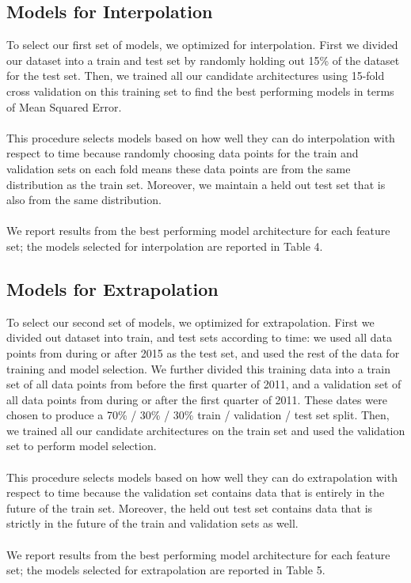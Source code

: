 \documentclass{article}
\begin{document}

\subsection{Models for Interpolation}
To select our first set of models, we optimized for interpolation. First we divided our dataset into a train and test set by randomly holding out 15\% of the dataset for the test set. Then, we trained all our candidate architectures using 15-fold cross validation on this training set to find the best performing models in terms of Mean Squared Error.\\\\
This procedure selects models based on how well they can do interpolation with respect to time because randomly choosing data points for the train and validation sets on each fold means these data points are from the same distribution as the train set. Moreover, we maintain a held out test set that is also from the same distribution.\\\\
We report results from the best performing model architecture for each feature set; the models selected for interpolation are reported in Table 4.

\subsection{Models for Extrapolation}

To select our second set of models, we optimized for extrapolation. First we divided out dataset into train, and test sets according to time: we used all data points from during or after 2015 as the test set, and used the rest of the data for training and model selection. We further divided this training data into a train set of all data points from before the first quarter of 2011, and a validation set of all data points from during or after the first quarter of 2011. These dates were chosen to produce a 70\% / 30\% / 30\% train / validation  / test set split. Then, we trained all our candidate architectures on the train set and used the validation set to perform model selection.\\\\
This procedure selects models based on how well they can do extrapolation with respect to time because the validation set contains data that is entirely in the future of the train set. Moreover, the held out test set contains data that is strictly in the future of the train and validation sets as well.\\\\
We report results from the best performing model architecture for each feature set; the models selected for extrapolation are reported in Table 5.
\end{document}

